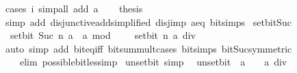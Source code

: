\begin{isabellebody}
\ {\isacharparenleft}{\kern0pt}cases\ i{\isacharcomma}{\kern0pt}\ simp{\isacharunderscore}{\kern0pt}all\ add{\isacharcolon}{\kern0pt}\ a{\isacharparenright}{\kern0pt}\isanewline
\ \ \isamarkupfalse%
\ {\isacharquery}{\kern0pt}thesis\isanewline
\ \ \ \ \isamarkupfalse%
\ {\isacharparenleft}{\kern0pt}simp\ add{\isacharcolon}{\kern0pt}\ disjunctive{\isacharunderscore}{\kern0pt}add{\isacharbrackleft}{\kern0pt}simplified\ disj{\isacharunderscore}{\kern0pt}imp{\isacharbrackright}{\kern0pt}\ a{\isacharunderscore}{\kern0pt}eq\ bit{\isacharunderscore}{\kern0pt}simps{\isacharparenright}{\kern0pt}\isanewline
{}\isamarkupfalse%
%
\endisatagproof
{\isafoldproof}%
%
\isadelimproof
\isanewline
%
\endisadelimproof
\isanewline
{}\isamarkupfalse%
\ set{\isacharunderscore}{\kern0pt}bit{\isacharunderscore}{\kern0pt}Suc{\isacharcolon}{\kern0pt}\isanewline
\ \ {\isacartoucheopen}set{\isacharunderscore}{\kern0pt}bit\ {\isacharparenleft}{\kern0pt}Suc\ n{\isacharparenright}{\kern0pt}\ a\ {\isacharequal}{\kern0pt}\ a\ mod\ {}\ {\isacharplus}{\kern0pt}\ {}\ {\isacharasterisk}{\kern0pt}\ set{\isacharunderscore}{\kern0pt}bit\ n\ {\isacharparenleft}{\kern0pt}a\ div\ {}{\isacharparenright}{\kern0pt}{\isacartoucheclose}\isanewline
%
\isadelimproof
\ \ %
\endisadelimproof
%
\isatagproof
{}\isamarkupfalse%
\ {\isacharparenleft}{\kern0pt}auto\ simp\ add{\isacharcolon}{\kern0pt}\ bit{\isacharunderscore}{\kern0pt}eq{\isacharunderscore}{\kern0pt}iff\ bit{\isacharunderscore}{\kern0pt}sum{\isacharunderscore}{\kern0pt}mult{\isacharunderscore}{\kern0pt}{}{\isacharunderscore}{\kern0pt}cases\ bit{\isacharunderscore}{\kern0pt}simps\ bit{\isacharunderscore}{\kern0pt}Suc{\isacharbrackleft}{\kern0pt}symmetric{\isacharbrackright}{\kern0pt}\isanewline
\ \ \ \ elim{\isacharcolon}{\kern0pt}\ possible{\isacharunderscore}{\kern0pt}bit{\isacharunderscore}{\kern0pt}less{\isacharunderscore}{\kern0pt}imp{\isacharparenright}{\kern0pt}%
\endisatagproof
{\isafoldproof}%
%
\isadelimproof
\isanewline
%
\endisadelimproof
\isanewline
{}\isamarkupfalse%
\ unset{\isacharunderscore}{\kern0pt}bit{\isacharunderscore}{\kern0pt}{}\ {\isacharbrackleft}{\kern0pt}simp{\isacharbrackright}{\kern0pt}{\isacharcolon}{\kern0pt}\isanewline
\ \ {\isacartoucheopen}unset{\isacharunderscore}{\kern0pt}bit\ {}\ a\ {\isacharequal}{\kern0pt}\ {}\ {\isacharasterisk}{\kern0pt}\ {\isacharparenleft}{\kern0pt}a\ div\ {}{\isacharparenright}{\kern0pt}{\isacartoucheclose}\isanewline

\end{isabellebody}
